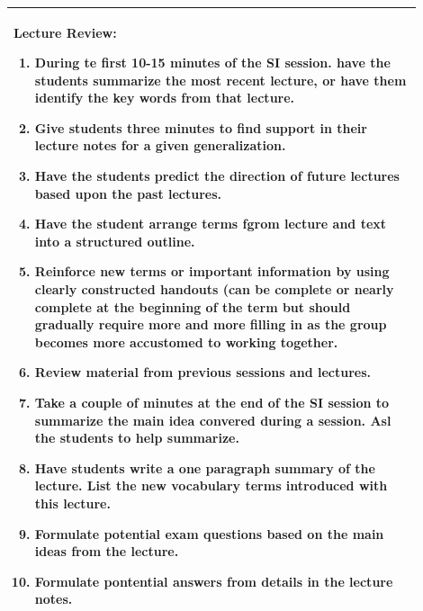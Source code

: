\documentclass{article}
\begin{document}
\begin{tabular}{|p{0.9\linewidth}|}
\hline
\vspace{0.2cm}
\textbf{Lecture Review:}
\begin{enumerate}
\item During te first 10-15 minutes of the SI session. have the students summarize the most recent lecture, or have them identify the key words from that lecture.
\item Give students three minutes to find support in their lecture notes for a given generalization.
\item Have the students predict the direction of future lectures based upon the past lectures.
\item Have the student arrange terms fgrom lecture and text into a structured outline.
\item Reinforce new terms or important information by using clearly constructed handouts (can be complete or nearly complete at the beginning of the term but should gradually require more and more filling in as the group becomes more accustomed to working together.
\item Review material from previous sessions and lectures.
\item Take a couple of minutes at the end of the SI session to summarize the main idea convered during a session. Asl the students to help summarize.
\item Have students write a one paragraph summary of the lecture. List the new vocabulary terms introduced with this lecture.
\item Formulate potential exam questions based on the main ideas from the lecture.
\item Formulate pontential answers from details in the lecture notes.
\end{enumerate} \\
\hline
\end{tabular}
\end{document}
